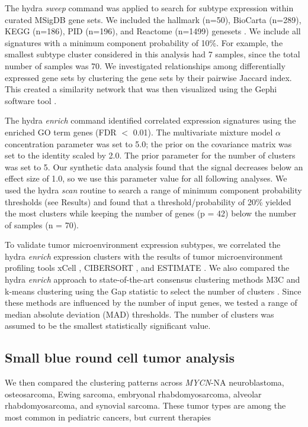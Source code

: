 \documentclass[10pt,letterpaper]{article}
\begin{document}
The hydra \textit{sweep} command was applied to search for subtype expression within curated MSigDB gene sets. We included the hallmark (n=50), BioCarta (n=289), KEGG (n=186), PID (n=196), and Reactome (n=1499) genesets \cite{liberzonMolecularSignaturesDatabase2011}. We include all signatures with a minimum component probability of 10\%. For example, the smallest subtype cluster considered in this analysis had 7 samples, since the total number of samples was 70. We investigated relationships among differentially expressed gene sets by clustering the gene sets by their pairwise Jaccard index. This created a similarity network that was then visualized using the Gephi software tool \cite{bastian2009gephi}.

The hydra \textit{enrich} command identified correlated expression signatures using the enriched GO term genes (FDR $<$ 0.01). The multivariate mixture model $\alpha$ concentration parameter was set to 5.0; the prior on the covariance matrix was set to the identity scaled by 2.0. The prior parameter for the number of clusters was set to 5. Our synthetic data analysis found that the signal decreases below an effect size of 1.0, so we use this parameter value for all following analyses. We used the hydra \textit{scan} routine to search a range of minimum component probability thresholds (see Results) and found that a threshold/probability of 20\% yielded the most clusters while keeping the number of genes (p = 42) below the number of samples (n = 70).

To validate tumor microenvironment expression subtypes, we correlated the hydra \textit{enrich} expression clusters with the results of tumor microenvironment profiling tools xCell \cite{aranXCellDigitallyPortraying2017}, CIBERSORT \cite{newmanRobustEnumerationCell2015}, and ESTIMATE \cite{yoshiharaInferringTumourPurity2013a}. We also compared the hydra \textit{enrich} approach to state-of-the-art consensus clustering methods M3C \cite{johnM3CMonteCarlo2018} and k-means clustering using the Gap statistic to select the number of clusters \cite{tibshirani2001estimating}. Since these methods are influenced by the number of input genes, we tested a range of median absolute deviation (MAD) thresholds. The number of clusters was assumed to be the smallest statistically significant value.

\subsection*{Small blue round cell tumor analysis}
We then compared the clustering patterns across \textit{MYCN}-NA neuroblastoma, osteosarcoma, Ewing sarcoma, embryonal rhabdomyosarcoma, alveolar rhabdomyosarcoma, and synovial sarcoma. These tumor types are among the most common in pediatric cancers, but current therapies
\end{document}
